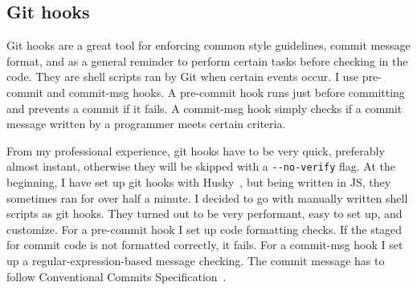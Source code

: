 \subsection{Git hooks}\label{sec:git-hooks}

Git hooks are a great tool
for enforcing common style guidelines,
commit message format,
and as a general reminder
to perform certain tasks before checking in the code.
They are shell scripts ran by Git
when certain events occur.
I use pre-commit and commit-msg hooks.
A pre-commit hook runs just before committing
and prevents a commit if it fails.
A commit-msg hook simply checks
if a commit message written by a programmer
meets certain criteria.

From my professional experience,
git hooks have to be very quick,
preferably almost instant,
otherwise they will be skipped
with a \texttt{{-}{-}no-verify} flag.
At the beginning,
I have set up git hooks
with Husky~\cite{typicode_husky_2022},
but being written in \ac{JS},
they sometimes ran for over half a minute.
I decided to go with manually written shell scripts
as git hooks.
They turned out to be very performant,
easy to set up, and customize.
For a pre-commit hook I set up code formatting checks.
If the staged for commit code is not formatted correctly,
it fails.
For a commit-msg hook I set up a regular-expression-based
message checking.
The commit message has to follow
Conventional Commits Specification~\cite{petrungaro_conventional_2019}.
